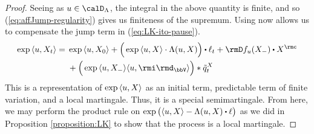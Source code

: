 \begin{proof}
  Seeing as $\momentVar \in \odeSpace$, the integral in the above quantity is finite, and so (\ref{eq:affJump-regularity}) gives us finiteness of the supremum.
  Using \cite[Proposition II.1.28]{jacod2003} now allows us to compensate the jump term in (\ref{eq:LK-ito-pause}).
  \begin{equation*}
    \exp\prj{\momentVar}{\X_t}
    = \begin{aligned}[t]
      &\exp\prj{\momentVar}{\X_0} 
      + \Big( \exp\prj{\momentVar}{\X} \cdot \ode(\momentVar, \X) \Big) \shortInt \leb_t 
      + \Der f_\momentVar(\X_-) \shortInt \X^\rmc \\
      &+ \Big( \exp\prj{\momentVar}{\X_-} \prj{\momentVar}{\id_\vecSpace} \Big) \ast \compensate{\jumpMeas^\X}_t 
    \end{aligned}
  \end{equation*}
  This is a representation of $\exp{\langle u, X\rangle}$ as an initial term, predictable term of finite variation, and a local martingale.
  Thus, it is a special semimartingale.
  From here, we may perform the product rule on $\exp\big(\prj{\momentVar}{\X} - \ode(\momentVar, \X) \shortInt \leb\big)$ as we did in Proposition \ref{proposition:LK} to show that the process is a local martingale.
\end{proof}
